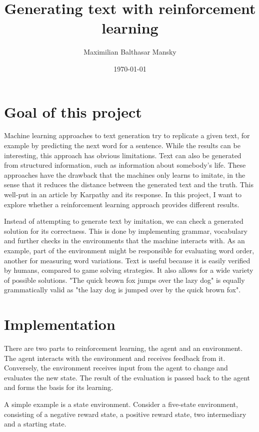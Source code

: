 \documentclass[a4paper, justified]{tufte-handout}
\title{Generating text with reinforcement learning}
\author{Maximilian Balthasar Mansky}
\date{\today}
\begin{document}
\maketitle

\section{Goal of this project}

Machine learning approaches to text generation try to replicate a given text, for example by predicting the next word for a sentence. While the results can be interesting, this approach has obvious limitations.\cite{lau2020} Text can also be generated from structured information, such as information about somebody's life.\cite{lebret2010} These approaches have the drawback that the machines only learns to imitate, in the sense that it reduces the distance between the generated text and the truth. This well-put in an article by Karpathy\cite{karpathy2015} and its response\cite{goldberg2015}. In this project, I want to explore whether a reinforcement learning approach provides different results.

Instead of attempting to generate text by imitation, we can check a generated solution for its correctness. This is done by implementing grammar, vocabulary and further checks in the environments that the machine interacts with. As an example, part of the environment might be responsible for evaluating word order, another for measuring word variations. Text is useful because it is easily verified by humans, compared to game solving strategies. It also allows for a wide variety of possible solutions. "The quick brown fox jumps over the lazy dog" is equally grammatically valid as "the lazy dog is jumped over by the quick brown fox".

\section{Implementation}

There are two parts to reinforcement learning, the agent and an environment. The agent interacts with the environment and receives feedback from it. Conversely, the environment receives input from the agent to change and evaluates the new state. The result of the evaluation is passed back to the agent and forms the basis for its learning.

A simple example is a state environment. Consider a five-state environment, consisting of a negative reward state, a positive reward state, two intermediary and a starting state. 
\end{document}
